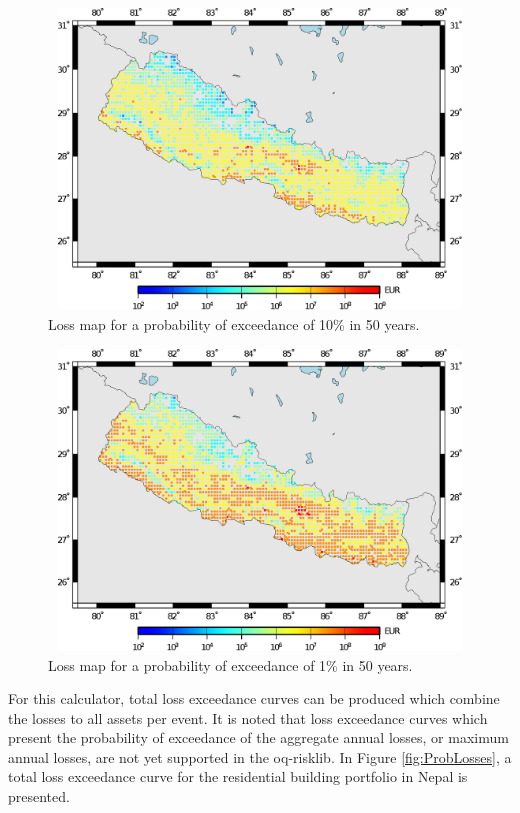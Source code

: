 \begin{figure}[H]
\centering
\includegraphics[width=12cm,height=8cm]{./figures/risk/LossMap01.eps} 
\caption{Loss map for a probability of exceedance of 10\% in 50 years.}
\label{fig:LossCurve001}
\end{figure} 

\begin{figure}[H]
\centering
\includegraphics[width=12cm,height=8cm]{./figures/risk/LossMap001.eps} 
\caption{Loss map for a probability of exceedance of 1\% in 50 years.}
\label{fig:LossCurve01}
\end{figure} 

For this calculator, total loss exceedance curves can be produced which combine the losses to all \glspl{asset} per event. It is noted that loss exceedance curves which present the probability of exceedance of the aggregate annual losses, or maximum annual losses, are not yet supported in the oq-risklib. In Figure \ref{fig:ProbLosses}, a total loss exceedance curve for the residential building portfolio in Nepal is presented. 
 
